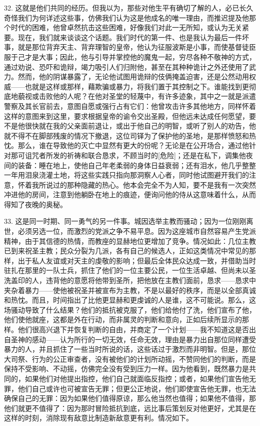 32. 这就是他们共同的经历。但我以为，那些对他生平有确切了解的人，必已长久奇怪我们为何详述这些事，仿佛我们认为这是他成名的唯一理由，而推迟提及他那个时代的困难，他曾卓然抗击这些困难，好像我们对此一无所知，或认为无关紧要。现在，我们就来谈谈这个话题。我们时代的第一件、也是我认为最后一件坏事，就是那位背弃天主、背弃理智的皇帝，他认为征服波斯是小事，而使基督徒臣服于己才是大事；因此，他与引导并掌控他的魔鬼一起，穷尽各种不敬神的方式，通过劝说、恐吓和诡辩，竭力吸引人们归附他，甚至在其种种诡计之外还使用了武力。然而，他的阴谋暴露了，无论他试图用诡辩的伎俩掩盖迫害，还是公然动用权威——也就是这样或那样，藉欺骗或暴力，将我们置于其控制之下。谁能找到更彻底地藐视或击败他的人呢？在他对圣堂的轻蔑中，有许多迹象，其中之一就是派遣警察及其长官前去，意图自愿或强行占有它们：他曾攻击许多其他地方，同样怀着这样的意图来到这里，要求根据皇帝的谕令交出圣殿，但他远未达成任何愿望，要不是他很快就在我的父亲面前退让，或出于他自己的明智，或听了别人的劝告，他就不得不在脚部残废的情况下撤退，这位司铎为了保护他的圣地，是那样愤怒和热忱。那么，谁在导致他的灭亡中显然有更大的份呢？无论是在公开场合，通过他针对那可诅咒者所发的祈祷和联合恳求，不顾当时的[危险]；还是在私下，调集他夜间的装备：睡在地上，使他自己年老柔弱的身体日益衰弱；还有泪水，他几乎整整一年用泪泉浇灌土地，将这些实践只指向那洞察人心者，同时他试图避开我们的注意，怀着我所说过的那种隐藏的热心。他本会完全不为人知，要不是我有一次突然冲进他的房间，注意到他躺卧在地上的痕迹，便询问他的侍从这意味着什么，从而得知了夜晚的奥秘。\par

33. 这是同一时期、同一勇气的另一件事。城因选举主教而骚动；因为一位刚刚离世，必须另选一位，而激烈的党派之争不易平息。因为这座城市自然容易产生党派精神，由于其信德的热情，而教座的显赫地位更增加了竞争。情况如此：几位主教已到来祝圣主教；民众分裂为几派，各有自己的候选人，正如这类情况中常见的那样，出于私人友谊或对天主的虔敬的影响；但最后全体民众达成一致，并借助当时驻扎在那里的一队士兵，抓住了他们的一位主要公民，一位生活卓越、但尚未以圣洗盖印的人，违背他的意愿将他带到圣所，把他放在主教们面前，恳求——恳求中夹杂着暴力——使他被祝圣并被宣布为主教，不是以最好的秩序，而是以全部真诚和热忱。而且，时间指出了比他更显赫和更虔诚的人是谁，这不可能说。那么，这场骚动导致了什么结果？他们的抵抗被克服了，他们给他付了洗，他们宣布了他，他们使他就座，这都是外在行动，而非属灵的判断和意向，正如后续所显示的那样。他们很高兴退下并恢复判断的自由，并商定了一个计划——我不知道这是否出自圣神的感动——认为所行的一切无效，任命无效，理由是暴力出自那位同样遭受暴力的人，并且抓住了一些当时所说的话，这些话过于激烈而非明智。但是，那位大司祭、行为的公正审查者，没有被他们的计划所动摇，不赞同他们的判断，而是保持不受影响、不动摇，仿佛完全没有受到压力一样。因为他看到，既然暴力是共同的，如果他们对他提出指控，他们自己就面临反指控；或者，如果他们宣告他无罪，他们自己或许也可被宣告无罪；但更公正地说，他们即使宣告他无罪，也无法确保自己的无罪：因为如果他们值得原谅，那么他当然也值得；如果他不值得，那他们就更不值得了：因为那时冒险抵抗到底，远比事后策划反对他更好，尤其是在这样的时刻，消除现有敌意比制造新敌意更有利。情况如下。\par

